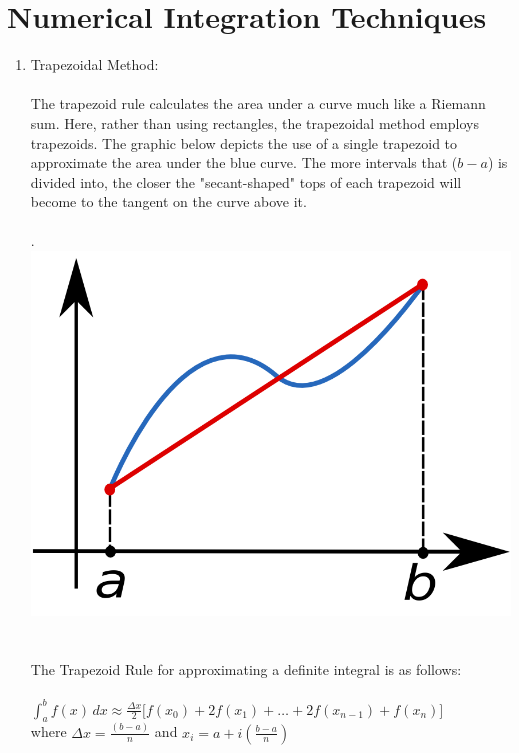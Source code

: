 \documentclass{report}
\begin{document}
\section{Numerical Integration Techniques}
\begin{enumerate}
\item Trapezoidal Method:
\\
\\
The trapezoid rule calculates the area under a curve much like a Riemann sum. Here, rather than using rectangles, the trapezoidal method employs trapezoids. The graphic below depicts the use of a single trapezoid to approximate the area under the blue curve. The more intervals that ($b-a$) is divided into, the closer the "secant-shaped" tops of each trapezoid will become to the tangent on the curve above it.\\
\\
. \hspace{30 mm} \includegraphics[scale=.15]{trapezoid.png}
\\
\\
\\
The Trapezoid Rule for approximating a definite integral is as follows:
\\
\\ $\displaystyle \int^b_a f(x)\,dx  \approx  \frac{\Delta x}{2}\Big[f(x_{0})+2f(x_1)+\ldots+2f(x_{n-1})+f(x_n)\Big]$ 
\\where \hspace{10 mm} $\displaystyle \Delta x = \frac{(b-a)}{n}$ 
\hspace{7 mm} and \hspace{7 mm} $\displaystyle x_i = a + i(\frac{b-a}{n})$

\end{enumerate}
\end{document}
